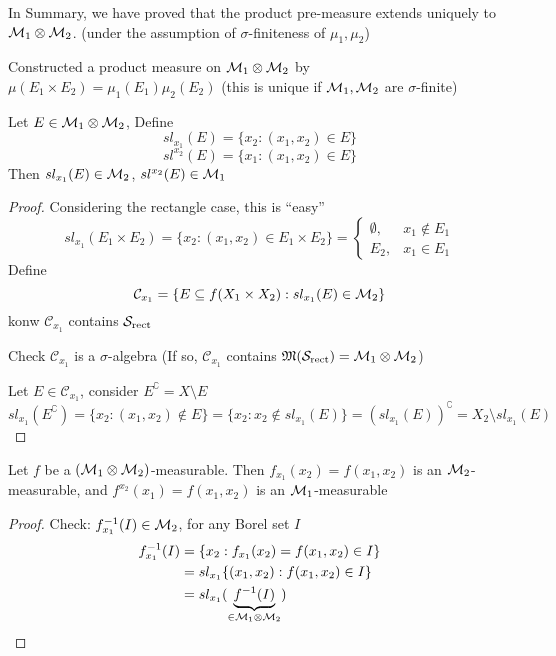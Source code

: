 \begin{remark}
  In Summary, we have proved that the product pre-measure extends uniquely to $\mathcal M_1 \otimes \mathcal M_2$. (under the assumption of $\sigma$-finiteness of $\mu_1, \mu_2$)
\end{remark}

\begin{remark}
  Constructed a product measure on $\mathcal M_1 \otimes \mathcal M_2$ by $\mu(E_1 \times E_2) = \mu_1(E_1)\mu_2(E_2)$
  (this is unique if $\mathcal M_1, \mathcal M_2$ are $\sigma$-finite)
\end{remark}

\begin{proposition}
  Let $E \in \mathcal M_1 \otimes \mathcal M_2$, Define  
  \[sl_{x_1}(E) = \{x_2: (x_1, x_2) \in E\}\]
  \[sl^{x_2}(E) = \{x_1 : (x_1, x_2) \in E\}\]
  Then $sl_{x_1}(E) \in \mathcal M_2$, $sl^{x_2}(E) \in \mathcal M_1$
\end{proposition}

\begin{proof}
  Considering the rectangle case, this is ``easy''
  \[sl_{x_1}(E_1 \times E_2) = \{x_2 : (x_1, x_2) \in E_1 \times E_2\} = \begin{cases}
    \emptyset, & x_1 \notin E_1\\
    E_2, & x_1 \in E_1
  \end{cases}\]
  Define
  \[\mathcal{C}_{x_1} = \{E \subseteq f(X_1 \times X_2) : sl_{x_1}(E) \in \mathcal M_2\}\]
  konw $\mathcal{C}_{x_1}$ contains $\mathcal S_{\text{rect}}$ 

  Check $\mathcal{C}_{x_1}$ is a $\sigma$-algebra (If so, $\mathcal{C}_{x_1}$ contains $\mathfrak M(\mathcal S_{\text{rect}}) = \mathcal M_1 \otimes \mathcal M_2$)

  Let $E \in \mathcal{C}_{x_1}$, consider $E^\complement = X \setminus E$  
  \[sl_{x_1}(E^\complement) = \{x_2 : (x_1, x_2) \not\in E\} = \{x_2 : x_2 \not\in sl_{x_1}(E)\} = (sl_{x_1}(E))^\complement = X_2 \setminus sl_{x_1}(E)\]
\end{proof}

\begin{lemma}
  Let $f$ be a $(\mathcal M_1 \otimes \mathcal M_2)$-measurable. Then $f_{x_1}(x_2) = f(x_1, x_2)$ is an $\mathcal M_2$-measurable,
  and $f^{x_2}(x_1) = f(x_1, x_2)$ is an $\mathcal M_1$-measurable
\end{lemma}

\begin{proof}
  Check: $f^{-1}_{x_1}(I) \in \mathcal M_2$, for any Borel set $I$
  \begin{align*}
    f^{-1}_{x_1}(I) &= \{x_2 : f_{x_1}(x_2) = f(x_1, x_2) \in I\} \\
    &= sl_{x_1}\{(x_1, x_2) : f(x_1, x_2) \in I\} \\
    &= sl_{x_1}(\underbrace{f^{-1}(I)}_{\in \mathcal M_1 \otimes \mathcal M_2})
  \end{align*}
\end{proof}

